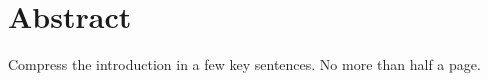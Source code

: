 
 \setcounter{tocdepth}{2}
 \tableofcontents
 \cleardoublepage






\chapter*{Abstract}

  Compress the introduction in a few key sentences. No more than half a page.

 \cleardoublepage




